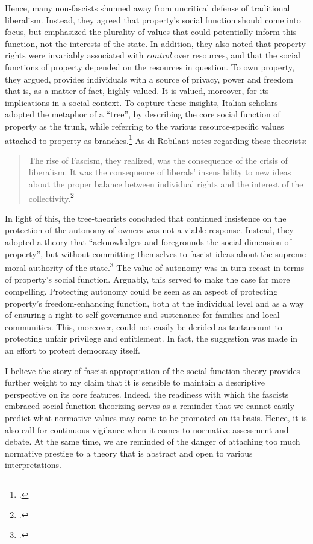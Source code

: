 Hence, many non-fascists shunned away from uncritical defense of traditional liberalism. Instead, they agreed that property's social function should come into focus, but emphasized the plurality of values that could potentially inform this function, not the interests of the state. In addition, they also noted that property rights were invariably associated with {\it control} over resources, and that the social functions of property depended on the resources in question. To own property, they argued, provides individuals with a source of privacy, power and freedom that is, as a matter of fact, highly valued. It is valued, moreover, for its implications in a social context. To capture these insights, Italian scholars adopted the metaphor of a ``tree'', by describing the core social function of property as the trunk, while referring to the various resource-specific values attached to property as branches.\footcite[894-916]{robilant13} As di Robilant notes regarding these theorists:

\begin{quote}
The rise of Fascism, they realized, was the
consequence of the crisis of liberalism. It was the consequence of liberals' insensibility to new ideas about the proper balance between individual rights and the interest of the collectivity.\footcite[907]{robilant13}
\end{quote}

In light of this, the tree-theorists concluded that continued insistence on the protection of the autonomy of owners was not a viable response. Instead, they adopted a theory that ``acknowledges and foregrounds the social dimension of property'', but without committing themselves to fascist ideas about the supreme moral authority of the state.\footcite[907]{robilant13} The value of autonomy was in turn recast in terms of property's social function. Arguably, this served to make the case far more compelling. Protecting autonomy could be seen as an aspect of protecting property's freedom-enhancing function, both at the individual level and as a way of ensuring a right to self-governance and sustenance for families and local communities. This, moreover, could not easily be derided as tantamount to protecting unfair privilege and entitlement. In fact, the suggestion was made in an effort to protect democracy itself.

I believe the story of fascist appropriation of the social function theory provides further weight to my claim that it is sensible to  maintain a descriptive perspective on its core features. Indeed, the readiness with which the fascists embraced social function theorizing serves as a reminder that we cannot easily predict what normative values may come to be promoted on its basis. Hence, it is also call for continuous vigilance when it comes to normative assessment and debate. At the same time, we are reminded of the danger of attaching too much normative prestige to a theory that is abstract and open to various interpretations.

